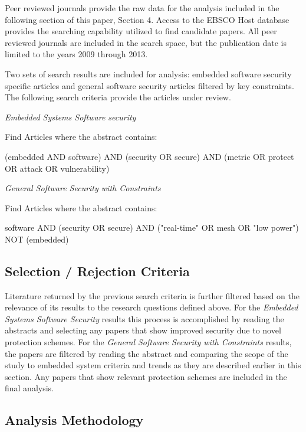 \documentclass[final,conference,10pt]{IEEEtran}
\begin{document}
Peer reviewed journals provide the raw data for the analysis included in the following section of this paper, Section 4.  Access to the EBSCO Host database provides the searching capability utilized to find candidate papers.  All peer reviewed journals are included in the search space, but the publication date is limited to the years 2009 through 2013.

Two sets of search results are included for analysis: embedded software security specific articles and general software security articles filtered by key constraints.  The following search criteria provide the articles under review. 

\textit{Embedded Systems Software security}

Find Articles where the abstract contains:
\begin{center}
(embedded AND software) AND (security OR secure) AND (metric OR protect OR attack OR vulnerability)
\end{center}

\textit{General Software Security with Constraints}

Find Articles where the abstract contains:
\begin{center}
software AND (security OR secure) AND ("real-time" OR mesh OR "low power") NOT (embedded)
\end{center}

\subsection{Selection / Rejection Criteria}

Literature returned by the previous search criteria is further filtered based on the relevance of its results to the research questions defined above.  For the \textit{Embedded Systems Software Security} results this process is accomplished by reading the abstracts and selecting any papers that show improved security due to novel protection schemes. For the \textit{General Software Security with Constraints} results, the papers are filtered by reading the abstract and comparing the scope of the study to embedded system criteria and trends as they are described earlier in this section. Any papers that show relevant protection schemes are included in the final analysis.

\subsection{Analysis Methodology}
\end{document}
